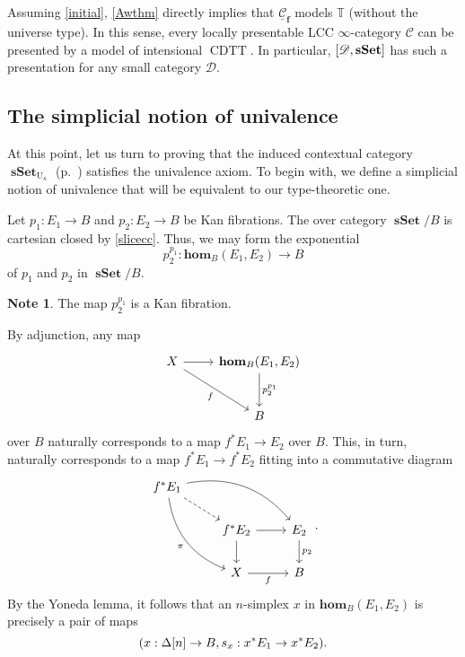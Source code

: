 \documentclass[10pt,letterpaper,cm]{nupset}
\theoremstyle{definition}
\newtheorem{note}[definition]{Note}
\theoremstyle{theorem}
\theoremstyle{remark}
\newcommand{\0}{\mathbf{0}}
\newcommand{\1}{\mathbf{1}}
\newcommand{\2}{\mathbf{2}}
\DeclareMathOperator{\cdtt}{\mathrm{CDTT}}
\DeclareMathOperator{\sset}{\mathbf{sSet}}
\renewcommand{\c}{\mathscr{C}}
\renewcommand{\d}{\mathscr{D}}
\newcommand{\T}{\mathbb T}
\begin{document}
Assuming \cref{initial}, \cref{Awthm} directly implies that $\underline{\c}_{\mathbf{f}}$ models $\T$ (without the universe type). In this sense, every locally presentable LCC $\infty$-category $\c$ can be presented by a model of intensional $\cdtt$. In particular, $\mleft[\d, \sset\mright]$ has such a presentation for any small category $\d$.


\subsection{The simplicial notion of univalence}\label{suniv}

At this point, let us turn to proving that the induced contextual category $\sset_{\mathrm{U}_{\kappa}}$ (p.~\pageref{indcxtcat}) satisfies the univalence axiom. To begin with, we define a simplicial notion of univalence that will be equivalent to our type-theoretic one.

\bigskip

Let $p_1 : E_1\to B$ and $p_2 : E_2 \to B$ be Kan fibrations. The over category $\sset/B$ is cartesian closed by \cref{slicecc}. Thus, we may form the exponential $$p_2^{p_1}: \mathbf{hom}_B(E_1, E_2) \to B$$ of $p_1$ and $p_2$ in $\sset/B$. 

\begin{note}
The map $p_2^{p_1}$ is a Kan fibration.
\end{note}

\smallskip

By adjunction, any map 
\[
\begin{tikzcd}[row sep=large]
X \arrow[rd, "f"'] \arrow[r] & {\mathbf{hom}_B(E_1, E_2)} \arrow[d, "p_2^{p_1}"] \\
                             & B                                                
\end{tikzcd}
\] over $B$ naturally corresponds to a map $f^{\ast}{E_1} \to E_2$ over $B$. This, in turn, naturally corresponds to a map $f^{\ast}{E_1} \to f^{\ast}{E_2}$ fitting into a commutative diagram
\[
\begin{tikzcd}
f^{\ast}{E_1} \arrow[rrd, bend left] \arrow[rdd, "\pi"', bend right] \arrow[rd, dashed] &                                   &                      \\
                                                                                        & f^{\ast}{E_2} \arrow[d] \arrow[r] & E_2 \arrow[d, "p_2"] \\
                                                                                        & X \arrow[r, "f"']                 & B                   
\end{tikzcd}
.\] By the Yoneda lemma, it follows that an $n$-simplex $x$ in $\mathbf{hom}_B(E_1, E_2)$ is precisely a pair  of maps $$\mleft(x: \Delta[n]\to B, s_x : x^{\ast}{E_1} \to x^{\ast}{E_2}\mright).$$
\end{document}
